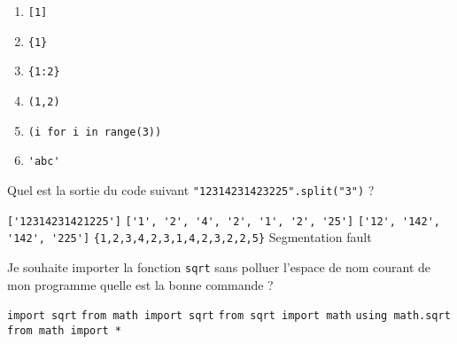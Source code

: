 \documentclass[french,a4paper,addpoints,11pt]{exam}
\begin{document}
\begin{questions}
    \begin{multicols}{2}
        \begin{enumerate}
            \item \lstinline|[1]| \hspace{1em} \fillin[liste]
            \item \lstinline|{1}| \hspace{1em} \fillin[set]
            \item \lstinline|{1:2}| \hspace{1em} \fillin[dictionnaire]
            \item \lstinline|(1,2)| \hspace{1em} \fillin[tuple]
            \item \lstinline|(i for i in range(3))| \hspace{1em} \fillin[générateur]
            \item \lstinline|'abc'| \hspace{1em} 
        \end{enumerate}
    \end{multicols}

    \question

    Quel est la sortie du code suivant \lstinline|"12314231423225".split("3")| ?

       \begin{multicols}{2}
    \begin{checkboxes}
        \choice \lstinline|['12314231421225']|
        \choice \lstinline|['1', '2', '4', '2', '1', '2', '25']|
        \CorrectChoice \lstinline|['12', '142', '142', '225']|
        \choice \lstinline|{1,2,3,4,2,3,1,4,2,3,2,2,5}|
        \choice Segmentation fault
    \end{checkboxes}
            \end{multicols}

    \question

    Je souhaite importer la fonction \lstinline|sqrt| sans polluer l'espace de nom courant de mon programme quelle est la bonne commande ?

       \begin{multicols}{2}
    \begin{checkboxes}
        \choice \lstinline{import sqrt}
        \choice \lstinline{from math import sqrt}
        \choice \lstinline{from sqrt import math}
        \choice \lstinline{using math.sqrt}
        \choice \lstinline{from math import *}
    \end{checkboxes}
         \end{multicols}


\end{questions}
\end{document}
